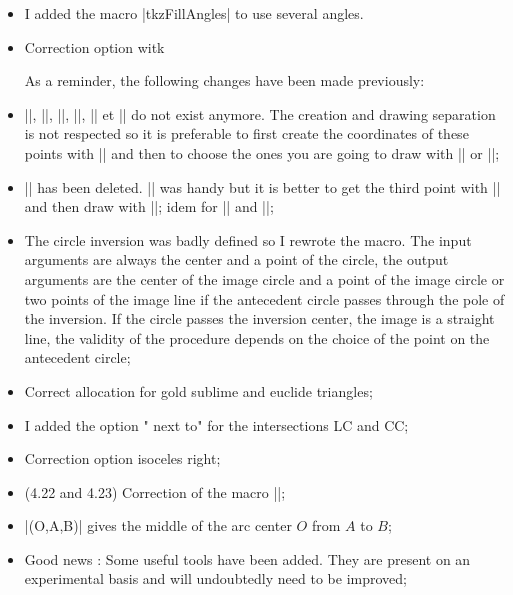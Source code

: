 \begin{itemize}
\item I added the macro |tkzFillAngles| to use several angles.

\item Correction option  witk 

As a reminder, the following changes have been made previously:
  
 \item  |\tkzDrawMedian|, |\tkzDrawBisector|, |\tkzDrawAltitude|, |\tkzDrawMedians|, |\tkzDrawBisectors| et  |\tkzDrawAltitudes| do not exist anymore. The creation and drawing separation is not respected so it is preferable to first create the coordinates of these points with |\tkzDefSpcTriangle[median]| and then to choose the ones you are going to draw with |\tkzDrawSegments| or |\tkzDrawLines|;
 
\item |\tkzDrawTriangle| has been deleted.  |\tkzDrawTriangle[equilateral]| was handy but it is better to get the third point with |\tkzDefTriangle[equilateral]| and then draw with |\tkzDrawPolygon|; idem for |\tkzDrawSquare| and |\tkzDrawGoldRectangle|; 


\item The circle inversion was badly defined so I rewrote the macro. The input arguments are always the center and a point of the circle, the output arguments are the center of the image circle and a point of the image circle or two points of the image line if the antecedent circle passes through the pole of the inversion. If the circle passes the inversion center, the image is a straight line, the validity of the procedure depends on the choice of the point on the antecedent circle; 

\item Correct allocation for gold sublime and euclide triangles;


\item I added the option " next to" for the intersections LC and CC;


\item Correction option isoceles right;

\item (4.22 and 4.23) Correction of the macro |\tkzMarkAngle|;


\item |\tkzDefMidArc(O,A,B)| gives the middle of the arc center $O$ from $A$ to $B$; 

\item Good news : Some useful tools have been added. They are present on an experimental basis and will undoubtedly need to be improved;



\end{itemize}

